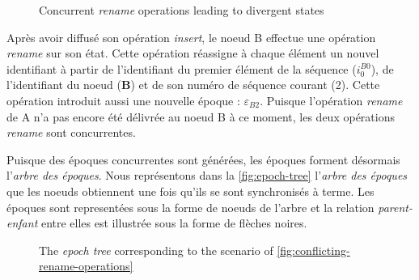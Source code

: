 \documentclass[12pt]{thesul}
\newcommand{\trm}[1]{\mathit{#1}}
\newcommand{\id}[3]{$\trm{#1}^{\trm{#2}}_{\trm{#3}}$}
\newcommand{\epoch}[1]{$\varepsilon_{#1}$}
\begin{document}
\begin{figure}[!ht]
{
  }
  \caption{Concurrent \emph{rename} operations leading to divergent states}
  \label{fig:conflicting-rename-operations}
\end{figure}

Après avoir diffusé son opération \emph{insert}, le noeud B effectue une opération \emph{rename} sur son état.
Cette opération réassigne à chaque élément un nouvel identifiant à partir de l'identifiant du premier élément de la séquence (\id{i}{B0}{0}), de l'identifiant du noeud (\textbf{B}) et de son numéro de séquence courant (2).
Cette opération introduit aussi une nouvelle époque : \epoch{B2}.
Puisque l'opération \emph{rename} de A n'a pas encore été délivrée au noeud B à ce moment, les deux opérations \emph{rename} sont concurrentes.

Puisque des époques concurrentes sont générées, les époques forment désormais l'\emph{arbre des époques}.
Nous représentons dans la \autoref{fig:epoch-tree} l'\emph{arbre des époques} que les noeuds obtiennent une fois qu'ils se sont synchronisés à terme.
Les époques sont representées sous la forme de noeuds de l'arbre et la relation \emph{parent-enfant} entre elles est illustrée sous la forme de flèches noires.

\begin{figure}[!ht]
  \centering
  \caption{The \emph{epoch tree} corresponding to the scenario of \autoref{fig:conflicting-rename-operations}}
  \label{fig:epoch-tree}
\end{figure}
\end{document}
